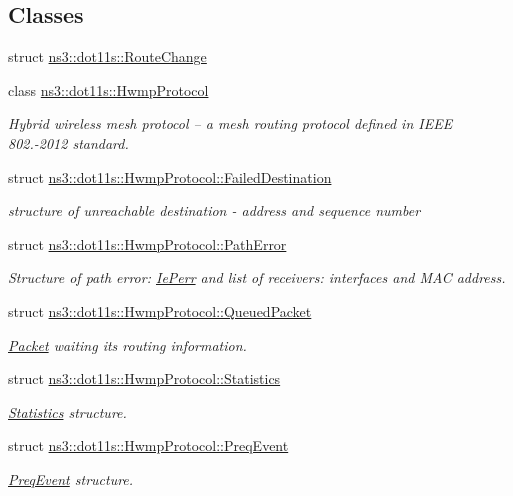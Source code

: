 \subsection*{Classes}
\begin{DoxyCompactItemize}
\item 
struct \hyperlink{structns3_1_1dot11s_1_1RouteChange}{ns3\+::dot11s\+::\+Route\+Change}
\item 
class \hyperlink{classns3_1_1dot11s_1_1HwmpProtocol}{ns3\+::dot11s\+::\+Hwmp\+Protocol}
\begin{DoxyCompactList}\small\item\em Hybrid wireless mesh protocol -- a mesh routing protocol defined in I\+E\+EE 802.-\/2012 standard. \end{DoxyCompactList}\item 
struct \hyperlink{structns3_1_1dot11s_1_1HwmpProtocol_1_1FailedDestination}{ns3\+::dot11s\+::\+Hwmp\+Protocol\+::\+Failed\+Destination}
\begin{DoxyCompactList}\small\item\em structure of unreachable destination -\/ address and sequence number \end{DoxyCompactList}\item 
struct \hyperlink{structns3_1_1dot11s_1_1HwmpProtocol_1_1PathError}{ns3\+::dot11s\+::\+Hwmp\+Protocol\+::\+Path\+Error}
\begin{DoxyCompactList}\small\item\em Structure of path error\+: \hyperlink{classns3_1_1dot11s_1_1IePerr}{Ie\+Perr} and list of receivers\+: interfaces and M\+AC address. \end{DoxyCompactList}\item 
struct \hyperlink{structns3_1_1dot11s_1_1HwmpProtocol_1_1QueuedPacket}{ns3\+::dot11s\+::\+Hwmp\+Protocol\+::\+Queued\+Packet}
\begin{DoxyCompactList}\small\item\em \hyperlink{classns3_1_1Packet}{Packet} waiting its routing information. \end{DoxyCompactList}\item 
struct \hyperlink{structns3_1_1dot11s_1_1HwmpProtocol_1_1Statistics}{ns3\+::dot11s\+::\+Hwmp\+Protocol\+::\+Statistics}
\begin{DoxyCompactList}\small\item\em \hyperlink{structns3_1_1dot11s_1_1HwmpProtocol_1_1Statistics}{Statistics} structure. \end{DoxyCompactList}\item 
struct \hyperlink{structns3_1_1dot11s_1_1HwmpProtocol_1_1PreqEvent}{ns3\+::dot11s\+::\+Hwmp\+Protocol\+::\+Preq\+Event}
\begin{DoxyCompactList}\small\item\em \hyperlink{structns3_1_1dot11s_1_1HwmpProtocol_1_1PreqEvent}{Preq\+Event} structure. \end{DoxyCompactList}\end{DoxyCompactItemize}
